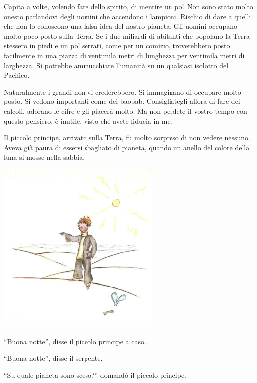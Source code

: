 \documentclass[11pt]{scrbook}
\begin{document}
Capita a volte, volendo fare dello spirito, di mentire un po'. Non sono stato molto onesto parlandovi degli uomini che accendono i lampioni. Rischio di dare a quelli che non lo conoscono una falsa idea del nostro pianeta. Gli uomini occupano molto poco posto sulla Terra. Se i due miliardi di abitanti che popolano la Terra stessero in piedi e un po' serrati, come per un comizio, troverebbero posto facilmente in una piazza di ventimila metri di lunghezza per ventimila metri di larghezza. Si potrebbe ammucchiare l'umanità su un qualsiasi isolotto del Pacifico.

Naturalmente i grandi non vi crederebbero. Si immaginano di occupare molto posto. Si vedono importanti come dei baobab. Consigliategli allora di fare dei calcoli, adorano le cifre e gli piacerà molto. Ma non perdete il vostro tempo con questo pensiero, è inutile, visto che avete fiducia in me.

Il piccolo principe, arrivato sulla Terra, fu molto sorpreso di non vedere nessuno. Aveva già paura di essersi sbagliato di pianeta, quando un anello del colore della luna si mosse nella sabbia.

\begin{center}
\includegraphics{img/naZemi}
\end{center}

``Buona notte'', disse il piccolo principe a caso.

``Buona notte'', disse il serpente.

``Su quale pianeta sono sceso?'' domandò il piccolo principe.
\end{document}
